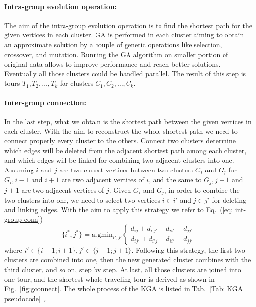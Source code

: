 \documentclass[10pt]{article}
\begin{document}
\paragraph{Intra-group evolution operation:}
The aim of the intra-group evolution operation is to find the shortest path for the given vertices in each cluster.
GA is performed in each cluster aiming to obtain an approximate solution by a couple of genetic operations like selection, crossover, and mutation.
Running the GA algorithm on smaller portion of original data allows to improve performance and reach better solutions.
Eventually all those clusters could be handled parallel.
The result of this step is tours $T_1,T_2,\dots,T_k$ for clusters $C_1,C_2,…,C_k$.
\paragraph{Inter-group connection:}
In the last step, what we obtain is the shortest path between the given vertices in each cluster.
With the aim to reconstruct the whole shortest path we need to connect properly every cluster to the others.
Connect two clusters determine which edges will be deleted from the adjacent shortest path among each cluster, and which edges will be linked for combining two adjacent clusters into one. 
Assuming $i$ and $j$ are two closest vertices between two clusters $G_i$ and $G_j$ for $G_i,i−1$ and $i+1$ are two adjacent vertices of $i$, and the same to $G_j,j−1$ and $j+1$ are two adjacent vertices of $j$. 
Given $G_i$ and $G_j$, in order to combine the two clusters into one, we need to select two vertices $i \in i′$ and $j \in j'$ for deleting and linking edges.
With the aim to apply this strategy we refer to Eq.~(\ref{eq: int-group-conn}) 
\begin{equation}
\{i^*,j^*\} = \mathrm{arg min}_{i',j'} 
\begin{cases}
d_{ij} + d_{i'j'} - d_{ii'} - d_{jj'}\\d_{ij'} + d_{i'j} - d_{ii'} - d_{jj'}
\end{cases}
\label{eq: int-group-conn}
\end{equation}
where $i' \in \{i-1; i+1\}, j' \in \{j-1;j+1\}$.
Following this strategy, the first two clusters are combined into one, then the new generated cluster combines with the third cluster, and so on, step by step. At last, all those clusters are joined into one tour, and the shortest whole traveling tour is derived as shown in Fig.~\ref{fig:gconnect}.
The whole process of the KGA is listed in Tab.~\ref{Tab: KGA pseudocode} \cite{ventitre},\cite{ventiquattro}.
\end{document}
